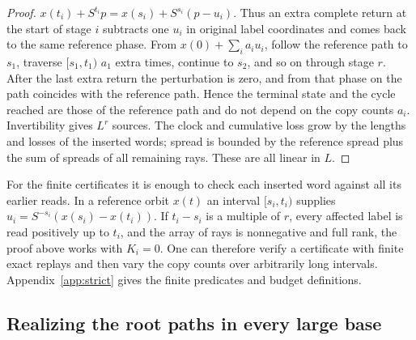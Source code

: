 \documentclass[11pt,reqno]{amsart}
\theoremstyle{remark}
\begin{document}
\begin{proof}
\(x(t_i)+S^{t_i}p=x(s_i)+S^{s_i}(p-u_i)\). Thus an extra complete
return at the start of stage \(i\) subtracts one \(u_i\) in original
label coordinates and comes back to the same reference phase. From
\(x(0)+\sum_ia_iu_i\), follow the reference path to \(s_1\), traverse
\([s_1,t_1)\) \(a_1\) extra times, continue to \(s_2\), and so on
through stage \(r\). After the last extra return the perturbation is
zero, and from that phase on the path coincides with the reference
path. Hence the terminal state and the cycle reached are those of
the reference path and do not depend on the copy counts \(a_i\).
Invertibility gives \(L^r\) sources. The clock and cumulative loss grow by the lengths
and losses of the inserted words; spread is bounded by the reference
spread plus the sum of spreads of all remaining rays. These are all
linear in \(L\).
\end{proof}

For the finite certificates it is enough to check each inserted word
against all its earlier reads. In a reference orbit \(x(t)\) an interval
\([s_i,t_i)\) supplies
\(u_i=S^{-s_i}(x(s_i)-x(t_i))\).
If \(t_i-s_i\) is a multiple of \(r\), every affected label is read
positively up to \(t_i\), and the array of rays is nonnegative and
full rank, the proof above works with \(K_i=0\). One can therefore
verify a certificate with finite exact replays and then vary the
copy counts over arbitrarily long intervals. Appendix~\ref{app:strict}
gives the finite predicates and budget definitions.

\subsection{Realizing the root paths in every large base}
\end{document}

